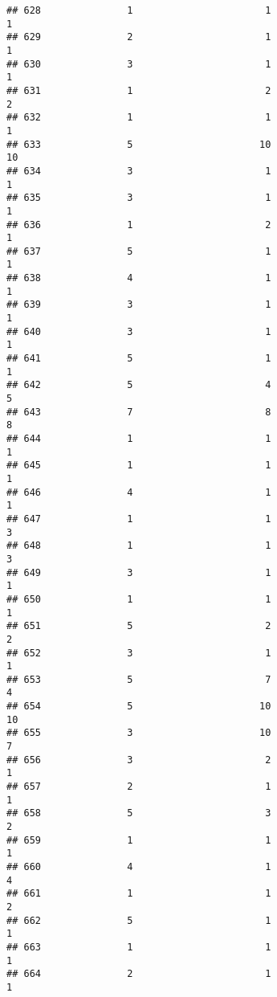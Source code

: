 \documentclass[
]{article}
\begin{document}
\begin{verbatim}
## 628               1                       1                        1
## 629               2                       1                        1
## 630               3                       1                        1
## 631               1                       2                        2
## 632               1                       1                        1
## 633               5                      10                       10
## 634               3                       1                        1
## 635               3                       1                        1
## 636               1                       2                        1
## 637               5                       1                        1
## 638               4                       1                        1
## 639               3                       1                        1
## 640               3                       1                        1
## 641               5                       1                        1
## 642               5                       4                        5
## 643               7                       8                        8
## 644               1                       1                        1
## 645               1                       1                        1
## 646               4                       1                        1
## 647               1                       1                        3
## 648               1                       1                        3
## 649               3                       1                        1
## 650               1                       1                        1
## 651               5                       2                        2
## 652               3                       1                        1
## 653               5                       7                        4
## 654               5                      10                       10
## 655               3                      10                        7
## 656               3                       2                        1
## 657               2                       1                        1
## 658               5                       3                        2
## 659               1                       1                        1
## 660               4                       1                        4
## 661               1                       1                        2
## 662               5                       1                        1
## 663               1                       1                        1
## 664               2                       1                        1

\end{verbatim}
\end{document}
